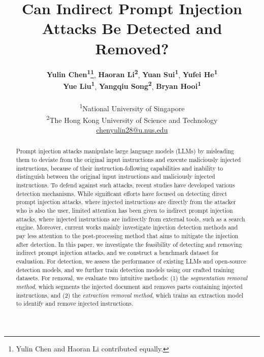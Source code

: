 \documentclass[11pt]{article}
\title{Can Indirect Prompt Injection Attacks Be Detected and Removed?}
\author{
 \textbf{Yulin Chen\textsuperscript{1}\thanks{Yulin Chen and Haoran Li contributed equally.}},
 \textbf{Haoran Li\textsuperscript{2}\footnotemark[1]},
 \textbf{Yuan Sui\textsuperscript{1}},
 \textbf{Yufei He\textsuperscript{1}}\\
 \textbf{Yue Liu\textsuperscript{1}},
 \textbf{Yangqiu Song\textsuperscript{2}},
 \textbf{Bryan Hooi\textsuperscript{1}}
\\
\\
 \textsuperscript{1}National University of Singapore \\
 \textsuperscript{2}The Hong Kong University of Science and Technology 
\\
 \small{
   \textbf{} \href{mailto:chenyulin28@u.nus.edu}{chenyulin28@u.nus.edu}
 }
}
\begin{document}
\maketitle
\begin{abstract}
Prompt injection attacks manipulate large language models (LLMs) by misleading them to deviate from the original input instructions and execute maliciously injected instructions, because of their instruction-following capabilities and inability to distinguish between the original input instructions and maliciously injected instructions. 
To defend against such attacks, recent studies have developed various detection mechanisms. While significant efforts have focused on detecting direct prompt injection attacks, where injected instructions are directly from the attacker who is also the user, limited attention has been given to indirect prompt injection attacks, where injected instructions are indirectly from external tools, such as a search engine. Moreover, current works mainly investigate injection detection methods and pay less attention to the post-processing method that aims to mitigate the injection after detection.
In this paper, we investigate the feasibility of detecting and removing indirect prompt injection attacks, and we construct a benchmark dataset for evaluation. For detection, we assess the performance of existing LLMs and open-source detection models, and we further train detection models using our crafted training datasets. For removal, we evaluate two intuitive methods: (1) the \textit{segmentation removal method}, which segments the injected document and removes parts containing injected instructions, and (2) the \textit{extraction removal method}, which trains an extraction model to identify and remove injected instructions.


\end{abstract}



%








\appendix


\label{sec:appendix}
\end{document}
